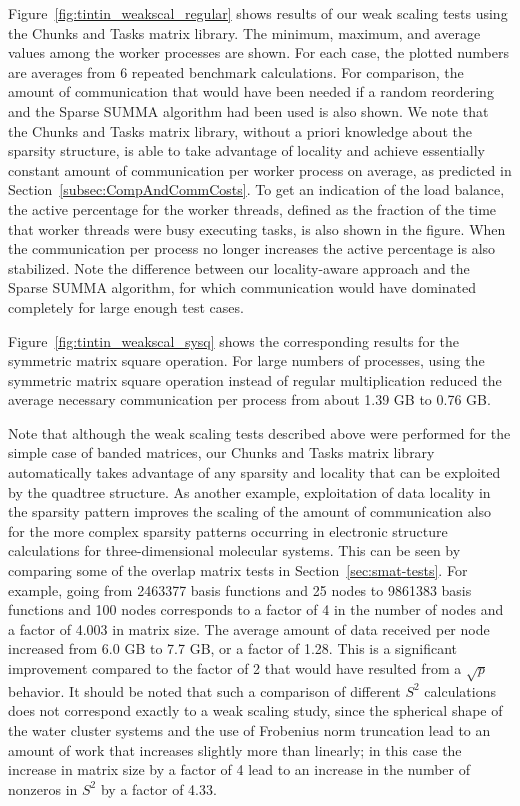 \documentclass{elsarticle}
\begin{document}
Figure~\ref{fig:tintin_weakscal_regular} shows results of our weak
scaling tests using the Chunks and Tasks matrix library.  The minimum,
maximum, and average values among the worker processes are shown. For
each case, the plotted numbers are averages from 6 repeated benchmark
calculations.  For comparison, the amount of communication that would
have been needed if a random reordering and the Sparse SUMMA algorithm
had been used is also shown.  We note that the Chunks and Tasks matrix
library, without a priori knowledge about the sparsity structure, is
able to take advantage of locality and achieve essentially constant
amount of communication per worker process on average, as predicted in
Section~\ref{subsec:CompAndCommCosts}.  To get an indication of the
load balance, the active percentage for the worker threads, defined as
the fraction of the time that worker threads were busy executing
tasks, is also shown in the figure.  When the communication per
process no longer increases the active percentage is also
stabilized. Note the difference between our locality-aware approach
and the Sparse SUMMA algorithm, for which communication would have
dominated completely for large enough test cases.

Figure~\ref{fig:tintin_weakscal_sysq} shows the corresponding results
for the symmetric matrix square operation. For large numbers of
processes, using the symmetric matrix square operation instead of
regular multiplication reduced the average necessary communication per process
from about 1.39 GB to 0.76 GB.


Note that although the weak scaling tests described above were
performed for the simple case of banded matrices, our Chunks and Tasks
matrix library automatically takes advantage of any sparsity and
locality that can be exploited by the quadtree structure.
As another example, exploitation of data locality in the
sparsity pattern improves the scaling of the amount of communication
also for the more complex sparsity patterns occurring in electronic
structure calculations for three-dimensional molecular systems. This can be seen by comparing some of the
overlap matrix tests in Section~\ref{sec:smat-tests}. For example,
going from 2463377 basis functions and 25 nodes to 9861383 basis
functions and 100 nodes corresponds to a factor of 4 in the number of
nodes and a factor of 4.003 in matrix size. The average amount of
data received per node increased from 6.0 GB to 7.7 GB, or a factor of
1.28. This is a significant improvement compared to the factor of 2
that would have resulted from a $\sqrt{p}$ behavior.
It should be noted that such a comparison of different $S^2$
calculations does not correspond exactly to a weak scaling study,
since the spherical shape of the water cluster systems and the use of Frobenius norm truncation lead to an amount of
work that increases slightly more than linearly; in this case the increase
in matrix size by a factor of 4 lead to an increase in the number of
nonzeros in $S^2$ by a factor of 4.33.
\end{document}
